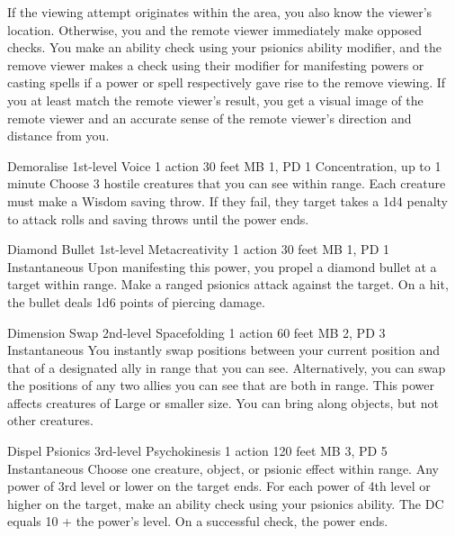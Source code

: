   If the viewing attempt originates within the area,
  you also know the viewer's location.
  Otherwise, you and the remote viewer immediately make opposed checks.
  You make an ability check using your psionics ability modifier,
  and the remove viewer makes a check using their modifier
  for manifesting powers or casting spells if a power or spell
  respectively gave rise to the remove viewing.
  If you at least match the remote viewer's result,
  you get a visual image of the remote viewer
  and an accurate sense of the remote viewer's
  direction and distance from you.

\DndPowerHeader%
  {Demoralise}
  {1st-level Voice}
  {1 action}
  {30 feet}
  {MB 1, PD 1}
  {Concentration, up to 1 minute}
Choose 3 hostile creatures that you can see within range.
Each creature must make a Wisdom saving throw.
If they fail, they target takes a 1d4 penalty to attack rolls and
saving throws until the power ends.

\DndPowerHeader%
  {Diamond Bullet}
  {1st-level Metacreativity}
  {1 action}
  {30 feet}
  {MB 1, PD 1}
  {Instantaneous}
  Upon manifesting this power,
  you propel a diamond bullet at a target within range.
  Make a ranged psionics attack against the target.
  On a hit, the bullet deals 1d6 points of piercing damage.

\DndPowerHeader%
  {Dimension Swap}
  {2nd-level Spacefolding}
  {1 action}
  {60 feet}
  {MB 2, PD 3}
  {Instantaneous}
  You instantly swap positions between your current position
  and that of a designated ally in range that you can see.
  Alternatively, you can swap the positions of
  any two allies you can see that are both in range.
  This power affects creatures of Large or smaller size.
  You can bring along objects, but not other creatures.

\DndPowerHeader%
  {Dispel Psionics}
  {3rd-level Psychokinesis}
  {1 action}
  {120 feet}
  {MB 3, PD 5}
  {Instantaneous}
  Choose one creature, object, or psionic effect within range.
  Any power of 3rd level or lower on the target ends.
  For each power of 4th level or higher on the target,
  make an ability check using your psionics ability.
  The DC equals 10 + the power's level.
  On a successful check, the power ends.

